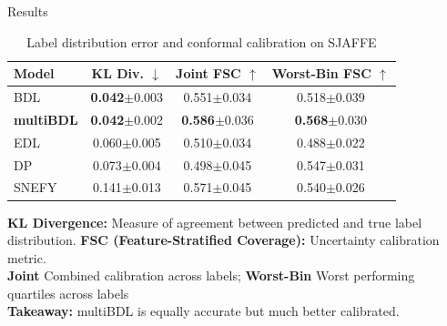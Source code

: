 \documentclass[aspectratio=169]{beamer}
\begin{document}
\begin{frame}{Results}
    \begin{table}
        \centering
        \caption{Label distribution error and conformal calibration on SJAFFE}
        \label{tab:sjaffe_results}
        \begin{tabular}{lccc}
            \toprule
            \textbf{Model} & \textbf{KL Div.} $\downarrow$ & \textbf{Joint FSC} $\uparrow$ & \textbf{Worst-Bin FSC} $\uparrow$ \\
            \midrule
            BDL              & \textbf{0.042}$\pm$0.003 & 0.551$\pm$0.034 & 0.518$\pm$0.039 \\
            \textbf{multiBDL} & \textbf{0.042}$\pm$0.002 & \textbf{0.586}$\pm$0.036 & \textbf{0.568}$\pm$0.030 \\
            EDL              & 0.060$\pm$0.005 & 0.510$\pm$0.034 & 0.488$\pm$0.022 \\
            DP               & 0.073$\pm$0.004 & 0.498$\pm$0.045 & 0.547$\pm$0.031 \\
            SNEFY            & 0.141$\pm$0.013 & 0.571$\pm$0.045 & 0.540$\pm$0.026 \\
            \bottomrule
        \end{tabular}
    \end{table}
    
    \footnotesize
    \textbf{KL Divergence:} Measure of agreement between predicted and true label distribution.
    \textbf{FSC (Feature-Stratified Coverage):} Uncertainty calibration metric. \\
    \textbf{Joint} Combined calibration across labels; \textbf{Worst-Bin} Worst performing quartiles across labels \\[0.3em]
    
    \vspace{0.5em}
    \normalsize
    \textbf{Takeaway:} multiBDL is equally accurate but much better calibrated.
\end{frame}
\end{document}
